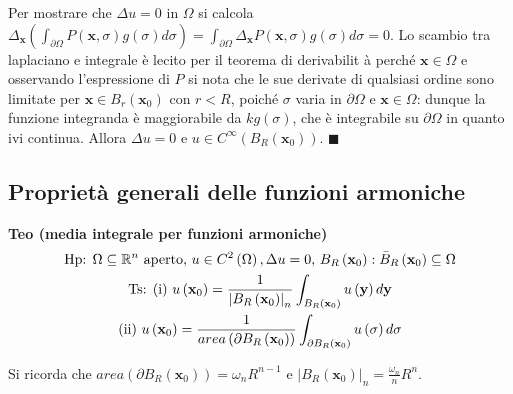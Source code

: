 \documentclass{article}
\begin{document}
Per mostrare che $\Delta u=0$ in $\Omega $ si calcola $\Delta _{\mathbf{x}%
}\left( \int_{\partial \Omega }P\left( \mathbf{x},\sigma \right) g\left(
\sigma \right) d\sigma \right) =\int_{\partial \Omega }\Delta _{\mathbf{x}%
}P\left( \mathbf{x},\sigma \right) g\left( \sigma \right) d\sigma =0$. Lo
scambio tra laplaciano e integrale \`{e} lecito per il teorema di derivabilit%
\`{a} perch\'{e} $\mathbf{x}\in \Omega $ e osservando l'espressione di $P$
si nota che le sue derivate di qualsiasi ordine sono limitate per $\mathbf{x}%
\in B_{r}\left( \mathbf{x}_{0}\right) $ con $r<R$, poich\'{e} $\sigma $
varia in $\partial \Omega $ e $\mathbf{x}\in \Omega $: dunque la funzione
integranda \`{e} maggiorabile da $kg\left( \sigma \right) $, che \`{e}
integrabile su $\partial \Omega $ in quanto ivi continua. Allora $\Delta u=0$
e $u\in C^{\infty }\left( B_{R}\left( \mathbf{x}_{0}\right) \right) $. $%
\blacksquare $

\subsection{Propriet\`{a} generali delle funzioni armoniche}

\textbf{Teo (media integrale per funzioni armoniche)}%
\begin{gather*}
\text{Hp: }\Omega \subseteq 
\mathbb{R}
^{n}\text{ aperto, }u\in C^{2}\left( \Omega \right) ,\Delta u=0\text{, }%
B_{R}\left( \mathbf{x}_{0}\right) :\bar{B}_{R}\left( \mathbf{x}_{0}\right)
\subseteq \Omega \\
\text{Ts: (i) }u\left( \mathbf{x}_{0}\right) =\frac{1}{\left\vert
B_{R}\left( \mathbf{x}_{0}\right) \right\vert _{n}}\int_{B_{R}\left( \mathbf{%
x}_{0}\right) }u\left( \mathbf{y}\right) d\mathbf{y} \\
\text{(ii) }u\left( \mathbf{x}_{0}\right) =\frac{1}{area\left( \partial
B_{R}\left( \mathbf{x}_{0}\right) \right) }\int_{\partial B_{R}\left( 
\mathbf{x}_{0}\right) }u\left( \sigma \right) d\sigma
\end{gather*}

Si ricorda che $area\left( \partial B_{R}\left( \mathbf{x}_{0}\right)
\right) =\omega _{n}R^{n-1}$ e $\left\vert B_{R}\left( \mathbf{x}_{0}\right)
\right\vert _{n}=\frac{\omega _{n}}{n}R^{n}$.
\end{document}
